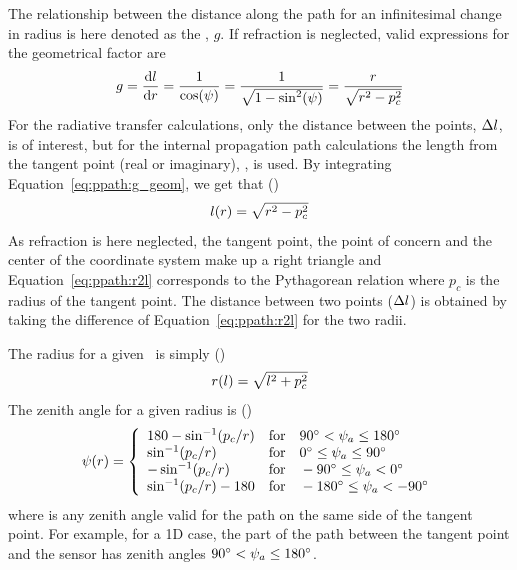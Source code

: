 The relationship between the distance along the path for an
infinitesimal change in radius is here denoted as the
, $g$. If refraction is neglected, valid
expressions for the geometrical factor are
\begin{equation}
  g = \frac{\mathrm{d} l}{\mathrm{d} r} 
           = \frac{1}{\cos(\psi)} = \frac{1}{\sqrt{1-\sin^2(\psi)}}
                                            = \frac{r}{\sqrt{r^2-p_c^2}}
  \label{eq:ppath:g_geom}
\end{equation}
For the radiative transfer calculations, only the distance between the
points, $\Delta l$, is of interest, but for the internal
propagation path calculations the length from the tangent point (real
or imaginary), \PpathLng, is used. By integrating
Equation~\ref{eq:ppath:g_geom}, we get that
()
\begin{equation}
  l(r) = \sqrt{r^2-p_c^2} 
  \label{eq:ppath:r2l}
\end{equation}
As refraction is here neglected, the tangent point, the point of
concern and the center of the coordinate system make up a right
triangle and Equation~\ref{eq:ppath:r2l} corresponds to the
Pythagorean relation where $p_c$ is the radius of the tangent point.
The distance between two points ($\Delta l$) is obtained by
taking the difference of Equation~\ref{eq:ppath:r2l} for the two
radii.

The radius for a given \PpathLng\ is simply ()
\begin{equation}
  r(l) = \sqrt{l^2+p_c^2} 
  \label{eq:ppath:l2r}
\end{equation}
The zenith angle for a given radius is ()
\begin{equation}
  \psi(r) = \left\{
   \begin{array}{ll}
    180 - \sin^{-1}(p_c/r) & 
                   \textrm{for}\quad 90^\circ < \psi_{a} \leq 180^\circ\\
    \sin^{-1}(p_c/r) & 
                   \textrm{for}\quad 0^\circ \leq \psi_{a} \leq 90^\circ\\
    -\sin^{-1}(p_c/r) & 
                   \textrm{for}\quad -90^\circ \leq \psi_{a} < 0^\circ\\
    \sin^{-1}(p_c/r) - 180 & 
                  \textrm{for}\quad -180^\circ \leq \psi_{a} < -90^\circ\\
   \end{array}   \right.
  \label{eq:ppath:r2psi}
\end{equation}
where  is any zenith angle valid for the path on the same
side of the tangent point. For example, for a 1D case, the part of the
path between the tangent point and the sensor has zenith angles
$90^\circ < \psi_{a} \leq 180^\circ$.

